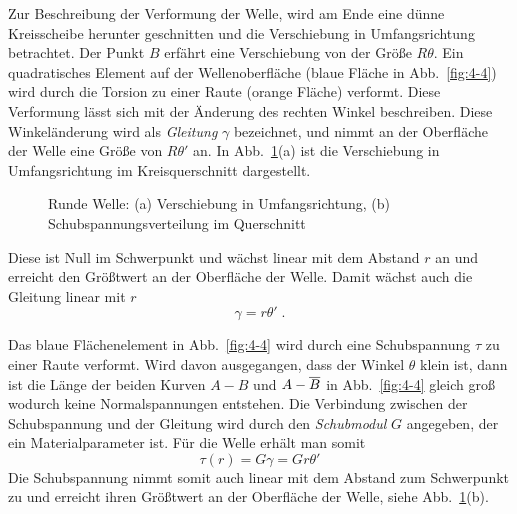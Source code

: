 Zur Beschreibung der Verformung der Welle, wird am Ende eine dünne Kreisscheibe herunter geschnitten und die Verschiebung in Umfangsrichtung betrachtet.
Der Punkt $B$ erfährt eine Verschiebung von der Größe $R\theta$.
Ein quadratisches Element auf der Wellenoberfläche (blaue Fläche in Abb.~\ref{fig:4-4}) wird durch die Torsion zu einer Raute (orange Fläche) verformt.
Diese Verformung lässt sich mit der Änderung des rechten Winkel beschreiben.
Diese Winkeländerung wird als \emph{Gleitung} $\gamma$ bezeichnet, und nimmt an der Oberfläche der Welle eine Größe von $R\theta'$ an.
In Abb.~\ref{fig:4-5}(a) ist die Verschiebung in Umfangsrichtung im Kreisquerschnitt dargestellt.
%
\begin{figure}[h!]
	\centering
	
	\caption{Runde Welle: (a) Verschiebung in Umfangsrichtung, (b) Schubspannungsverteilung im Querschnitt}
	\label{fig:4-5}
\end{figure}
%
Diese ist Null im Schwerpunkt und wächst linear mit dem Abstand $r$ an und erreicht den Größtwert an der Oberfläche der Welle.
Damit wächst auch die Gleitung linear mit $r$
%
\begin{equation}
\gamma = r\theta' \; .
\label{eq:4-2}
\end{equation}
%

Das blaue Flächenelement in Abb.~\ref{fig:4-4} wird durch eine Schubspannung $\tau$ zu einer Raute verformt.
Wird davon ausgegangen, dass der Winkel $\theta$ klein ist, dann ist die Länge der beiden Kurven $A-B$ und $A-\overline{B}$ in Abb.~\ref{fig:4-4} gleich groß wodurch keine Normalspannungen entstehen.
Die Verbindung zwischen der Schubspannung und der Gleitung wird durch den \emph{Schubmodul} $G$ angegeben, der ein Materialparameter ist.
Für die Welle erhält man somit
%
\begin{equation}
\tau(r) = G\gamma = Gr\theta'
\label{eq:4-3}
\end{equation}
%
Die Schubspannung nimmt somit auch linear mit dem Abstand zum Schwerpunkt zu und erreicht ihren Größtwert an der Oberfläche der Welle, siehe Abb.~\ref{fig:4-5}(b).

